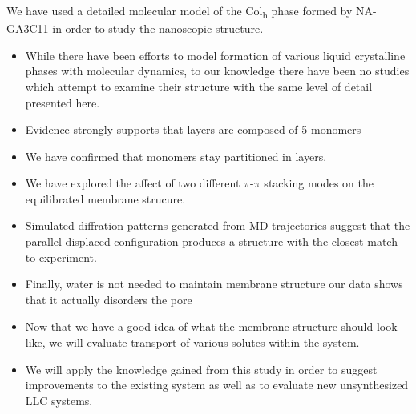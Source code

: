 \documentclass{article}
\begin{document}
  We have used a detailed molecular model of the Col\textsubscript{h} phase formed by NA-GA3C11
  in order to study the nanoscopic structure.
  \begin{itemize}
  	\item While there have been efforts to model formation of various liquid crystalline 
	phases with molecular dynamics, to our knowledge there have been no studies which 
	attempt to examine their structure with the same level of detail presented here.
	\item Evidence strongly supports that layers are composed of 5 monomers
        \item We have confirmed that monomers stay partitioned in layers.
	\item We have explored the affect of two different $\pi$-$\pi$ stacking modes on the equilibrated
	membrane strucure. 
	\item Simulated diffration patterns generated from MD trajectories suggest that
	the parallel-displaced configuration produces a structure with the closest match to experiment.
	\item Finally, water is not needed to maintain membrane structure our data 
	shows that it actually disorders the pore
	\item Now that we have a good idea of what the membrane structure should look like, we will
	evaluate transport of various solutes within the system. 
        \item We will apply the knowledge gained from this study in order to 
        suggest improvements to the existing system as well as to evaluate new
	unsynthesized LLC systems.
  \end{itemize}
  
\clearpage

\end{document}
